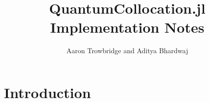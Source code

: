 \documentclass{article}
\title{QuantumCollocation.jl Implementation Notes}
\author{Aaron Trowbridge and Aditya Bhardwaj}
\date{}
\begin{document}
\maketitle



\tableofcontents

\newpage


\section{Introduction}
\end{document}
